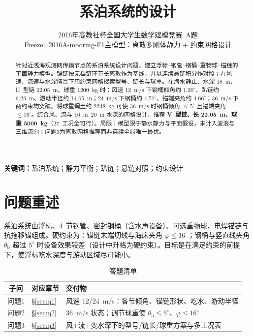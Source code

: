 \documentclass[UTF8,a4paper,12pt]{ctexart}
\title{\textbf{系泊系统的设计}}
\author{2016年高教社杯全国大学生数学建模竞赛~A题\\[0.4em]
\small Freeze:~2016A-mooring-F1\quad 主模型：离散多刚体静力 + 约束网格设计}
\date{}
\begin{document}
\maketitle

\begin{abstract}
针对近浅海观测网传输节点的系泊系统设计问题，建立浮标--钢管--钢桶--重物球--锚链的平面静力模型。锚链按无档链环节长离散作为基线，并以连续悬链积分作对照；在风速、流速与水深情景下用约束网格搜索型号、链长与球重。在海水静止、水深 \SI{18}{m}、II~型链 \SI{22.05}{m}、球重 \SI{1200}{kg} 时：风速 \SI{12}{m/s} 下钢桶倾角约 \(1.20^\circ\)、趴链约 \SI{6.25}{m}、游动半径约 \SI{14.65}{m}；\SI{24}{m/s} 下钢桶约 \(4.57^\circ\)、锚端夹角约 \(4.66^\circ\)；\SI{36}{m/s} 下两约束均突破。将球重调至约 \SI{2238}{kg} 可使 \SI{36}{m/s} 时钢桶倾角 \(\le 5^\circ\) 且锚端夹角 \(\le 16^\circ\)。综合风、流与 \SIrange{16}{20}{m} 水深的网格设计，推荐 \textbf{V~型链、长 \SI{22.05}{m}、球重 \SI{5000}{kg}}（27~工况全可行）。局限：模型限于静水静力与平面假设，未计入波浪与三维流向；问题3为离散网格推荐而非连续全局唯一最优。
\end{abstract}

\noindent\textbf{关键词：}系泊系统；静力平衡；趴链；悬链对照；约束设计

\section{问题重述}

系泊系统由浮标、4~节钢管、密封钢桶（含水声设备）、可选重物球、电焊锚链与抗拖移锚组成。硬约束为：锚链末端切线与海床夹角 \(\varphi\le 16^\circ\)；钢桶与竖直线夹角 \(\theta_{\mathrm{b}}\) 超过 \(5^\circ\) 时设备效果较差（设计中升格为硬约束）。目标是在满足约束的前提下，使浮标吃水深度与游动区域尽可能小。

\begin{table}[H]
\centering
\caption{答題清单}
\label{tab:todo}
\begin{tabular}{clp{8.5cm}}
\toprule
子问 & 对应章节 & 交付物 \\
\midrule
问题1 & \S\ref{sec:q1} & 风速 12/\SI{24}{m/s}：各节倾角、锚链形状、吃水、游动半径 \\
问题2 & \S\ref{sec:q2} & \SI{36}{m/s} 状态；调节球重使 \(\theta_{\mathrm{b}}\le5^\circ\)、\(\varphi\le16^\circ\) \\
问题3 & \S\ref{sec:q3} & 风+流+变水深下的型号/链长/球重方案与多工况表 \\
\bottomrule
\end{tabular}
\end{table}
\end{document}
